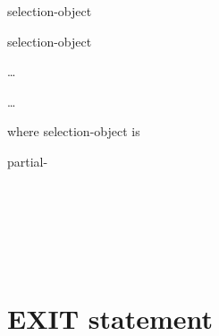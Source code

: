 \begin{1=}
  selection-object
  \begin{0-1}
     selection-object
  \end{0-1}\ldots\ {}
  \imperativestatement
\end{1=} \ldots

\begin{0-1}
    \imperativestatement
\end{0-1}

\begin{0-1}
\end{0-1}

where selection-object is

\begin{1=}
  partial-\expression
  \begin{0-1}
    \begin{1=}
       \\
    \end{1=}
    \expression
  \end{0-1} \\

   \\
   \\
\end{1=}

\section{EXIT statement}

\begin{0-1}
   \\
   \\

  \begin{0-1}
  \end{0-1} \\

   \\

   \\
\end{0-1}

